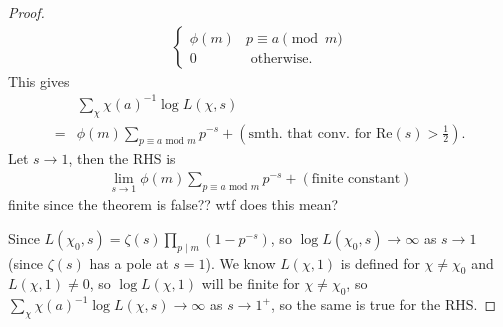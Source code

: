 \documentclass{article}
\theoremstyle{definition}
\begin{document}
\begin{proof}
\begin{align*}
\begin{cases}
            \phi(m) & p \equiv a \pmod{m}\\
            0 & \text{ otherwise}.
        \end{cases}
    \end{align*}
    This gives 
    \begin{align*}
        &\sum_{\chi}^{} \chi(a)^{-1} \log L(\chi,s) \\
        =& \phi(m) \sum_{p \equiv a \text{ mod }m}^{} p^{-s} + \left(\text{smth. that conv. for }\text{Re}(s)>\frac{1}{2}\right).
    \end{align*}
    Let $s \to 1$, then the RHS is 
    \begin{align*}
        \lim_{s \to 1} \phi(m) \sum_{p \equiv a \text{ mod }m}^{} p^{-s} + \left(\text{finite constant}\right)
    \end{align*}
    finite since the theorem is false?? wtf does this mean?
    \vspace{1mm}
     
    Since $L(\chi_0,s) = \zeta(s) \prod_{p \mid m}^{} (1-p^{-s})$, so $\log L(\chi_0,s) \to \infty$ as $s \to 1$ (since $\zeta(s)$ has a pole at $s=1$). We know $L(\chi,1)$ is defined for $\chi \neq \chi_0$ and $L(\chi,1) \neq 0$, so $\log L(\chi,1)$ will be finite for $\chi \neq \chi_0$, so $\sum_{\chi}^{} \chi(a)^{-1} \log L(\chi,s) \to \infty$ as $s \to 1^+$, so the same is true for the RHS. 
\end{proof}
\end{document}
